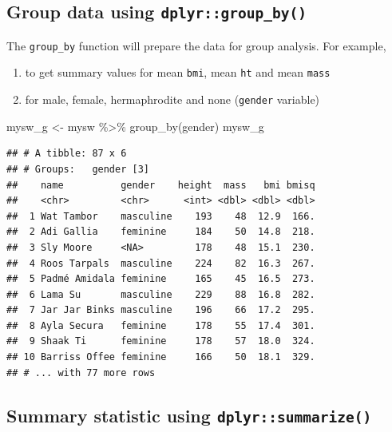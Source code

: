 \documentclass[
]{book}
\makeatletter
\newenvironment{Shaded}{\begin{snugshade}}{\end{snugshade}}
\newcommand{\FunctionTok}[1]{\textcolor[rgb]{0,0,0}{#1}}
\newcommand{\NormalTok}[1]{#1}
\newcommand{\OtherTok}[1]{\textcolor[rgb]{0.37,0.37,0.37}{#1}}
\newcommand{\SpecialCharTok}[1]{\textcolor[rgb]{0,0,0}{#1}}
\providecommand{\tightlist}{%
  \setlength{\itemsep}{0pt}\setlength{\parskip}{0pt}}
\newenvironment{kframe}{%
\medskip{}
\setlength{\fboxsep}{.8em}
 \def\at@end@of@kframe{}%
 \ifinner\ifhmode%
  \def\at@end@of@kframe{\end{minipage}}%
  \begin{minipage}{\columnwidth}%
 \fi\fi%
 \def\FrameCommand##1{\hskip\@totalleftmargin \hskip-\fboxsep
 \colorbox{shadecolor}{##1}\hskip-\fboxsep
     \hskip-\linewidth \hskip-\@totalleftmargin \hskip\columnwidth}%
 \MakeFramed {\advance\hsize-\width
   \@totalleftmargin\z@ \linewidth\hsize
   \@setminipage}}%
 {\par\unskip\endMakeFramed%
 \at@end@of@kframe}
\renewenvironment{Shaded}{\begin{kframe}}{\end{kframe}}
\makeatother
\begin{document}
\hypertarget{group-data-using-dplyrgroup_by}{%
\subsection{\texorpdfstring{Group data using \texttt{dplyr::group\_by()}}{Group data using dplyr::group\_by()}}\label{group-data-using-dplyrgroup_by}}

The \texttt{group\_by} function will prepare the data for group analysis. For example,

\begin{enumerate}
\def\labelenumi{\arabic{enumi}.}
\tightlist
\item
  to get summary values for mean \texttt{bmi}, mean \texttt{ht} and mean \texttt{mass}
\item
  for male, female, hermaphrodite and none (\texttt{gender} variable)
\end{enumerate}

\begin{Shaded}
\begin{Highlighting}[]
\NormalTok{mysw\_g }\OtherTok{\textless{}{-}}\NormalTok{ mysw }\SpecialCharTok{\%\textgreater{}\%} \FunctionTok{group\_by}\NormalTok{(gender)}
\NormalTok{mysw\_g}
\end{Highlighting}
\end{Shaded}

\begin{verbatim}
## # A tibble: 87 x 6
## # Groups:   gender [3]
##    name          gender    height  mass   bmi bmisq
##    <chr>         <chr>      <int> <dbl> <dbl> <dbl>
##  1 Wat Tambor    masculine    193    48  12.9  166.
##  2 Adi Gallia    feminine     184    50  14.8  218.
##  3 Sly Moore     <NA>         178    48  15.1  230.
##  4 Roos Tarpals  masculine    224    82  16.3  267.
##  5 Padmé Amidala feminine     165    45  16.5  273.
##  6 Lama Su       masculine    229    88  16.8  282.
##  7 Jar Jar Binks masculine    196    66  17.2  295.
##  8 Ayla Secura   feminine     178    55  17.4  301.
##  9 Shaak Ti      feminine     178    57  18.0  324.
## 10 Barriss Offee feminine     166    50  18.1  329.
## # ... with 77 more rows
\end{verbatim}

\hypertarget{summary-statistic-using-dplyrsummarize}{%
\subsection{\texorpdfstring{Summary statistic using \texttt{dplyr::summarize()}}{Summary statistic using dplyr::summarize()}}\label{summary-statistic-using-dplyrsummarize}}
\end{document}
